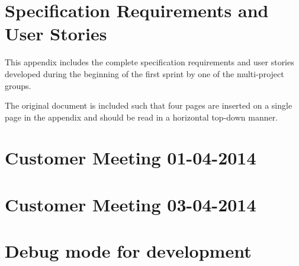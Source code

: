 \chapter{Specification Requirements and User Stories}\label{appendix:requirements}
This appendix includes the complete specification requirements and user stories developed during the beginning of the first sprint by one of the multi-project groups.

The original document is included such that four pages are inserted on a single page in the appendix and should be read in a horizontal top-down manner.



\chapter{Customer Meeting 01-04-2014}\label{appendix:firstmeeting}



\chapter{Customer Meeting 03-04-2014}\label{appendix:secondmeeting}


\chapter{Debug mode for development}
